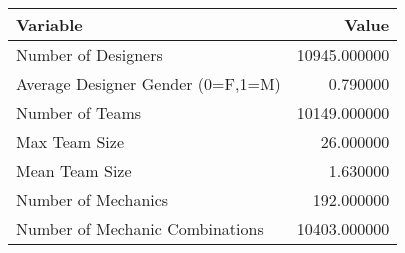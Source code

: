 \begin{tabular}{lr}
\toprule
Variable & Value \\
\midrule
Number of Designers & 10945.000000 \\
Average Designer Gender (0=F,1=M) & 0.790000 \\
Number of Teams & 10149.000000 \\
Max Team Size & 26.000000 \\
Mean Team Size & 1.630000 \\
Number of Mechanics & 192.000000 \\
Number of Mechanic Combinations & 10403.000000 \\
\bottomrule
\end{tabular}
